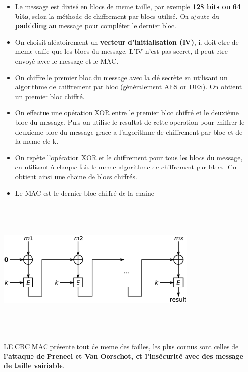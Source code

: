 \begin{itemize}
    \item [\textbullet] Le message est divisé en blocs de meme taille, par exemple \textbf{128 bits ou 64 bits}, selon la méthode de chiffrement par blocs utilisé. On ajoute du \textbf{paddding} au message pour compléter le dernier bloc.
    \item [\textbullet] On choisit aléatoirement un \textbf{vecteur d'initialisation (IV)}, il doit etre de meme taille que les blocs du message. L'IV n'est pas secret, il peut etre envoyé avec le message et le MAC.
    \item [\textbullet] On chiffre le premier bloc du message avec la clé secrète en utilisant un algorithme de chiffrement par bloc (généralement AES ou DES). On obtient un premier bloc chiffré.
    \item [\textbullet] On effectue une opération XOR entre le premier bloc chiffré et le deuxième bloc du message. Puis on utilise le resultat de cette operation pour chiffrer le deuxieme bloc du message grace a l'algorithme de chiffrement par bloc et de la meme cle k.
    \item [\textbullet] On repète l'opération XOR et le chiffrement pour tous les blocs du message, en utilisant à chaque fois le meme algorithme de chiffrement par blocs. On obtient ainsi une chaine de blocs chiffrés.
    \item [\textbullet] Le MAC est le dernier bloc chiffré de la chaine.
\end{itemize}

\begin{center}
    \includegraphics[width=10cm, height=7cm]{Sections/Images/CBC.svg.png}
\end{center}


LE CBC MAC présente tout de meme des failles, les plus connus sont celles de \textbf{l'attaque de Preneel et Van Oorschot, et l'insécurité avec des message de taille vairiable}.\\ 

